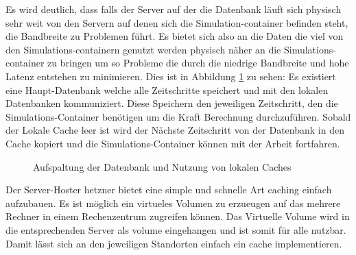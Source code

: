 \par Es wird deutlich, dass falls der Server auf der die Datenbank läuft sich
physisch sehr weit von den Servern auf denen sich die Simulation-container
befinden steht, die Bandbreite zu Problemen führt. Es bietet sich also an die
Daten die viel von den Simulations-containern genutzt werden physisch näher an
die Simulations-container zu bringen um so Probleme die durch die niedrige
Bandbreite und hohe Latenz entstehen zu minimieren. Dies ist in Abbildung
\ref{fig:local_caching} zu sehen: Es existiert eine Haupt-Datenbank welche alle
Zeitschritte speichert und mit den lokalen Datenbanken kommuniziert. Diese
Speichern den jeweiligen Zeitschritt, den die Simulations-Container benötigen
um die Kraft Berechnung durchzuführen. Sobald der Lokale Cache leer ist wird
der Nächste Zeitschritt von der Datenbank in den Cache kopiert und die
Simulations-Container können mit der Arbeit fortfahren.

\begin{figure}[ht]
    \centering
    \caption{Aufspaltung der Datenbank und Nutzung von lokalen Caches}
    \label{fig:local_caching}
\end{figure}

Der Server-Hoster hetzner bietet eine simple und schnelle Art caching einfach
aufzubauen.  Es ist möglich ein virtueles Volumen zu erzueugen auf das mehrere
Rechner in einem Rechenzentrum zugreifen können. Das Virtuelle Volume wird in
die entsprechenden Server als volume eingehangen und ist somit für alle
nutzbar.  Damit lässt sich an den jeweiligen Standorten einfach ein cache
implementieren.

